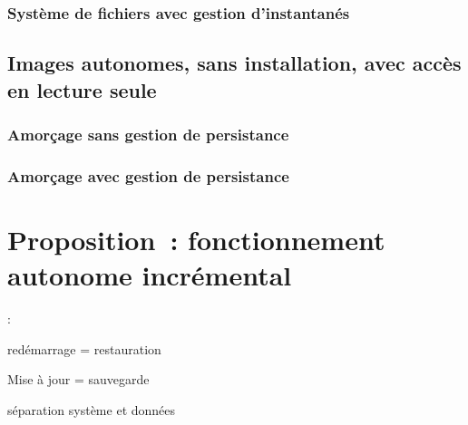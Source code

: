 \documentclass[12pt]{report}
\begin{document}
\ml
{\subsection{\todo}}
{\subsection{Système de fichiers avec gestion d’instantanés}}

\ml
{\section{\todo}}
{\section{Images autonomes, sans installation, avec accès en lecture seule}}

\ml
{\subsection{\todo}}
{\subsection{Amorçage sans gestion de persistance}}

\ml
{\subsection{\todo}}
{\subsection{Amorçage avec gestion de persistance}}

\ml
{\chapter{\todo}}
{\chapter{Proposition : fonctionnement autonome incrémental}}

:
\begin{itmz}
\item{\ml{}
{redémarrage = restauration}}
\item{\ml{}
{Mise à jour = sauvegarde}}
\item{\ml{}
{séparation système et données}}
\end{itmz}
\end{document}
